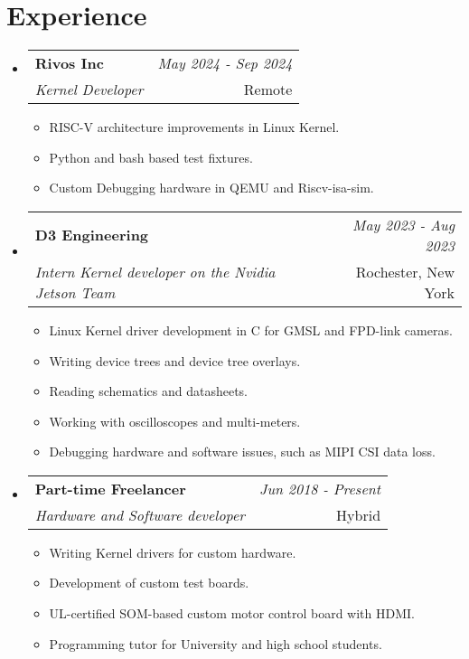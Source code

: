 \documentclass[a4paper,11pt]{article}
\makeatletter
\newcommand{\resumeSubheading}[4]{
\vspace{0.5mm}\item
		\begin{tabular*}{0.98\textwidth}[t]{l@{\extracolsep{\fill}}r}
				\textbf{#1} & \textit{\footnotesize{#4}} \\
				\textit{\footnotesize{#3}} &	\footnotesize{#2}\\
		\end{tabular*}
		\vspace{-2.4mm}
}
\newcommand{\resumeSubHeadingListStart}{\begin{itemize}[leftmargin=*,labelsep=0mm]}
\newcommand{\resumeItemListStart}{\begin{justify}\begin{itemize}[leftmargin=3ex, rightmargin=2ex, noitemsep,labelsep=1.2mm,itemsep=0mm]\small}
\newcommand{\resumeSubHeadingListEnd}{\end{itemize}\vspace{2mm}}
\newcommand{\resumeItemListEnd}{\end{itemize}\end{justify}\vspace{-2mm}}
\makeatother
\begin{document}
\section{\textbf{Experience}}
	\resumeSubHeadingListStart

		\resumeSubheading
			{Rivos Inc}{Remote}
			{Kernel Developer}{May 2024 - Sep 2024}
			\vspace{-2.0mm}
			\resumeItemListStart
		\item {RISC-V architecture improvements in Linux Kernel.}
		\item {Python and bash based test fixtures.}
		\item {Custom Debugging hardware in QEMU and Riscv-isa-sim.}
		\resumeItemListEnd

		\vspace{-3.0mm}

		\resumeSubheading
			{D3 Engineering}{Rochester, New York}
			{Intern Kernel developer on the Nvidia Jetson Team}{May 2023 - Aug 2023}
			\vspace{-2.0mm}
			\resumeItemListStart
		\item {Linux Kernel driver development in C for GMSL and FPD-link cameras.}
		\item {Writing device trees and device tree overlays.}
		\item {Reading schematics and datasheets.}
		\item {Working with oscilloscopes and multi-meters.}
		\item {Debugging hardware and software issues, such as MIPI CSI data loss.}
		\resumeItemListEnd

		\vspace{-3.0mm}

		\resumeSubheading
			{Part-time Freelancer}{Hybrid}
			{Hardware and Software developer}{Jun 2018 - Present}
			\vspace{-2.0mm}
			\resumeItemListStart
			\item {Writing Kernel drivers for custom hardware.}
			\item {Development of custom test boards.}
			\item {UL-certified SOM-based custom motor control board with HDMI.}
			\item {Programming tutor for University and high school students.}
		\resumeItemListEnd

		\vspace{-3.0mm}

	\resumeSubHeadingListEnd
\vspace{-5.5mm}
\end{document}
